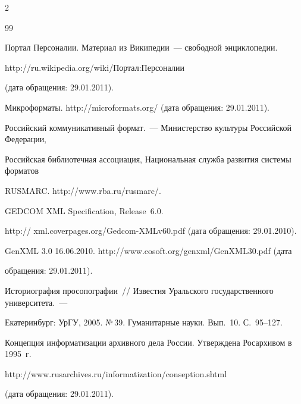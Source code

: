 \begin{multicols}{2}
{{\begin{thebibliography}{99}


Портал Персоналии. Материал из Википедии~--- свободной энциклопедии. {\sf 


http://ru.wikipedia.org/\linebreak wiki/Портал:Персоналии} (дата обращения: 29.01.2011).







Микроформаты. {\sf http://microformats.org/} (дата обращения: 29.01.2011).







Российский коммуникативный формат.~--- Министерство культуры Российской Федерации, 


Российская библиотечная ассоциация, Национальная служба развития системы форматов 


RUSMARC. {\sf http://www.rba.ru/rusmarc/}.







GEDCOM XML Specification, Release~6.0. 


{\sf http:// xml.coverpages.org/Gedcom-XMLv60.pdf} (дата обращения: 29.01.2010).







GenXML 3.0 16.06.2010. {\sf http://www.cosoft.org/\linebreak genxml/GenXML30.pdf} (дата 


обращения: 29.01.2011).









Историография просопографии~// Известия Уральского государственного университета.~--- 


Екатеринбург: УрГУ, 2005. №\,39. Гуманитарные науки. Вып.~10. С.~95--127.







Концепция информатизации архивного дела России. Утверждена Росархивом в 1995~г. {\sf 


http://\linebreak www.rusarchives.ru/informatization/conseption.shtml} (дата обращения: 29.01.2011).






\end{thebibliography}}}
\end{multicols}
